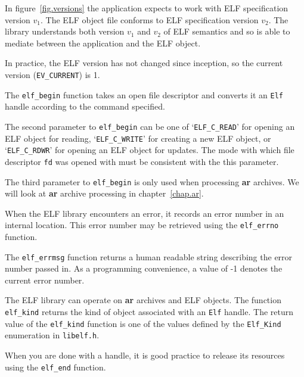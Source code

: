 \documentclass[a4paper,pdftex]{book}
\makeatletter
\newcommand{\constant}[1]{\texttt{#1}}
\newcommand{\function}[1]{\texttt{#1}}
\newcommand{\filename}[1]{\texttt{#1}}
\newcommand{\parameter}[1]{\texttt{#1}}
\newcommand{\tool}[1]{\textbf{#1}}
\newcommand{\type}[1]{\texttt{#1}}
\newenvironment{callout}[2][black]{%
  \begingroup\newcommand{\@cocolor}{#1}%
  \setlength{\shadowsize}{1.2pt}%
  \newcommand{\@cogroup}[1]{#2}}{\endgroup}
\newcommand{\@co}[1]{\shadowbox{\color{\@cocolor}#1}}
\newcommand{\coref}[1]{%
  \hypertarget{\@cogroup.#1.cr}{%
    \hyperlink{\@cogroup.#1.co}{\@co{#1}}}}
\makeatother
\begin{document}
\begin{callout}{prog1}
\begin{description}
    In figure~\vref{fig.versions} the application expects to work with
    ELF specification version $v_1$. The ELF object file conforms to
    ELF specification version $v_2$.  The library understands both
    version $v_1$ and $v_2$ of ELF semantics and so is able to mediate
    between the application and the ELF object.

    In practice, the ELF version has not changed since inception, so
    the current version (\constant{EV\_CURRENT}) is 1.

  \item[\coref{5}] The \function{elf\_begin} function takes an open file
    descriptor and converts it an \type{Elf} handle according to the
    command specified.

    The second parameter to \function{elf\_begin} can be one of
    `\constant{ELF\_C\_READ}' for opening an ELF object for reading,
    `\constant{ELF\_C\_WRITE}' for creating a new ELF object, or
    `\constant{ELF\_C\_RDWR}' for opening an ELF object for updates.
    The mode with which file descriptor \parameter{fd} was opened with
    must be consistent with the this parameter.

    The third parameter to \function{elf\_begin} is only used when
    processing \tool{ar} ar\-chives.  We will look at \tool{ar}
    archive processing in chapter~\vref{chap.ar}.

  \item[\coref{6}] When the ELF library encounters an error, it records
    an error number in an internal location.  This error number may be
    retrieved using the \function{elf\_errno} function.

    The \function{elf\_errmsg} function returns a human readable
    string describing the error number passed in.  As a programming
    convenience, a value of -1 denotes the current error number.

  \item[\coref{3} \coref{7}] The ELF library can operate on \tool{ar}
    archives and ELF objects.  The function \function{elf\_kind}
    returns the kind of object associated with an \type{Elf} handle.
    The return value of the \function{elf\_kind} function is one of
    the values defined by the \type{Elf\_Kind} enumeration in
    \filename{libelf.h}.

  \item[\coref{8}] When you are done with a handle, it is good practice
    to release its resources using the \function{elf\_end} function.
  \end{description}
\end{callout}
\end{document}
